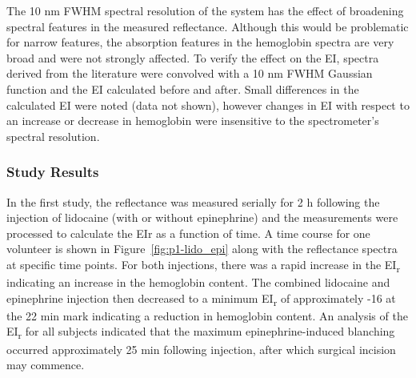 The 10 nm FWHM spectral resolution of the system has the effect of broadening spectral features in the measured reflectance. Although this would be problematic for narrow features, the absorption features in the hemoglobin spectra are very broad and were not strongly affected. To verify the effect on the EI, spectra derived from the literature\cite{Jacques1998} were convolved with a 10 nm FWHM Gaussian function and the EI calculated before and after. Small differences in the calculated EI were noted (data not shown), however changes in EI with respect to an increase or decrease in hemoglobin were insensitive to the spectrometer’s spectral resolution.

\subsubsection{Study Results}
In the first study, the reflectance was measured serially for 2 h following the injection of lidocaine (with or without epinephrine) and the measurements were processed to calculate the EIr as a function of time. A time course for one volunteer is shown in Figure~\ref{fig:p1-lido_epi} along with the reflectance spectra at specific time points. For both injections, there was a rapid increase in the EI\textsubscript{r} indicating an increase in the hemoglobin content. The combined lidocaine and epinephrine injection then decreased to a minimum EI\textsubscript{r} of approximately -16 at the 22 min mark indicating a reduction in hemoglobin content. An analysis of the EI\textsubscript{r} for all subjects indicated that the maximum epinephrine-induced blanching occurred approximately 25 min following injection, after which surgical incision may commence.\cite{McKee2013}

